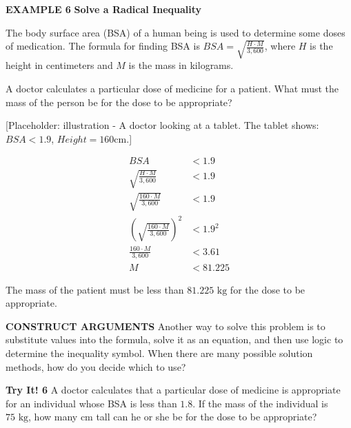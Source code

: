 \documentclass{article}
\newenvironment{concept-box}{}{}
\newenvironment{example}[1]{\textbf{EXAMPLE #1}\quad}{}
\newenvironment{tryit}[1]{\textbf{Try It! #1}\quad}{}
\newcommand{\answer}[1]{}
\newcommand{\placeholder}[2]{[Placeholder: #1 - #2]}
\newcommand{\te}[1]{}
\begin{document}
\begin{example}{6}
\textbf{Solve a Radical Inequality}

The body surface area (BSA) of a human being is used to determine some doses of medication. The formula for finding BSA is $BSA = \sqrt{\frac{H \cdot M}{3,600}}$, where $H$ is the height in centimeters and $M$ is the mass in kilograms.

A doctor calculates a particular dose of medicine for a patient. What must the mass of the person be for the dose to be appropriate?

\placeholder{illustration}{A doctor looking at a tablet. The tablet shows: $BSA < 1.9$, $Height = 160\text{cm}$.}

\begin{align*}
BSA &< 1.9 \\
\sqrt{\frac{H \cdot M}{3,600}} &< 1.9 \quad \text{\te{Substitute in an expression equal to $BSA$.}} \\
\sqrt{\frac{160 \cdot M}{3,600}} &< 1.9 \quad \text{\te{Substitute 160 for $H$, and solve for $M$.}} \\
\left(\sqrt{\frac{160 \cdot M}{3,600}}\right)^2 &< 1.9^2 \\
\frac{160 \cdot M}{3,600} &< 3.61 \\
M &< 81.225
\end{align*}

The mass of the patient must be less than $81.225\text{ kg}$ for the dose to be appropriate.
\end{example}

\begin{concept-box}
\textbf{CONSTRUCT ARGUMENTS}
Another way to solve this problem is to substitute values into the formula, solve it as an equation, and then use logic to determine the inequality symbol. When there are many possible solution methods, how do you decide which to use?
\end{concept-box}

\begin{tryit}{6}
A doctor calculates that a particular dose of medicine is appropriate for an individual whose BSA is less than $1.8$. If the mass of the individual is $75\text{ kg}$, how many cm tall can he or she be for the dose to be appropriate?
\answer{$H < 155.52\text{ cm}$}
\end{tryit}

\clearpage
\end{document}
